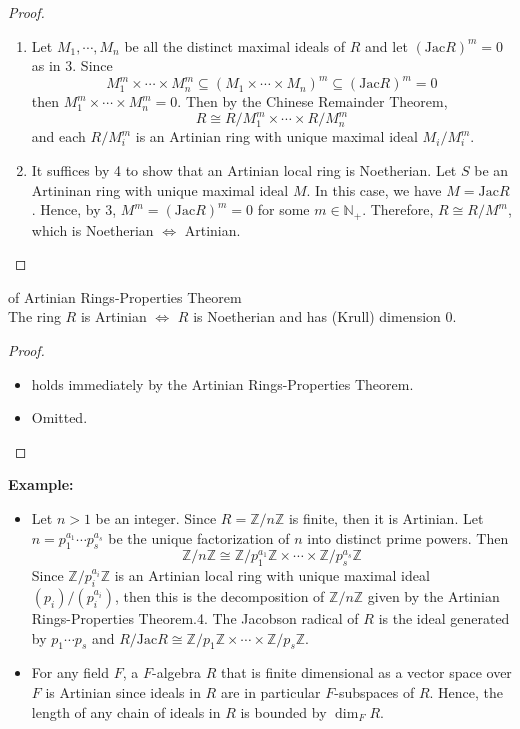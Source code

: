 \begin{proof}
\begin{enumerate}
        \item Let $M_1 ,\cdots, M_n$ be all the distinct maximal ideals of $R$ and let $(\text{Jac}R)^m =0$ as in 3. Since
        $$M_1 ^m \times \cdots \times M_n^m \subseteq (M_1 \times \cdots \times M_n)^m \subseteq (\text{Jac}R)^m =0$$
        then $M_1 ^m \times \cdots \times M_n^m=0$. Then by the Chinese Remainder Theorem,
        $$R \cong R/M_1^m \times \cdots \times R/M_n^m$$
        and each $R/M_i^m$ is an Artinian ring with unique maximal ideal $M_i/M_i^m$.

        \item It suffices by 4 to show that an Artinian local ring is Noetherian. Let $S$ be an Artininan ring with unique maximal ideal $M$. In this case, we have $M= \text{Jac}R$. Hence, by 3, $M^m =(\text{Jac}R)^m=0$ for some $m \in \mathbb{
        N
        }_+$. Therefore, $R\cong R/M^m$, which is Noetherian $\Leftrightarrow$ Artinian.
    \end{enumerate}
\end{proof}

\begin{corollary}{of Artinian Rings-Properties Theorem}\\
The ring $R$ is Artinian $\Leftrightarrow$ $R$ is Noetherian and has (Krull) dimension $0$.
\end{corollary}

\begin{proof}
    \begin{itemize}
        \item holds immediately by the Artinian Rings-Properties Theorem.
        \item Omitted.
    \end{itemize}
\end{proof}

\noindent\textbf{Example:} \begin{itemize}
    \item Let $n>1$ be an integer. Since $R= \mathbb{Z}/ n\mathbb{Z}$ is finite, then it is Artinian. Let $n =p_1^{a_1} \cdots p_s^{a_s}$ be the unique factorization of $n$ into distinct prime powers. Then 
    $$\mathbb{Z}/ n\mathbb{Z} \cong \mathbb{Z}/ p_1^{a_1} \mathbb{Z} \times \cdots\times \mathbb{Z}/ p_s ^{a_s}\mathbb{Z}$$
    Since $\mathbb{Z}/ p_i^{a_i}\mathbb{Z}$ is an Artinian local ring with unique maximal ideal $(p_i)/ (p_i^{a_i})$, then this is the decomposition of $\mathbb{Z}/ n\mathbb{Z}$ given by the Artinian Rings-Properties Theorem.4. The Jacobson radical of $R$ is the ideal generated by $p_1 \cdots p_s$ and $R/ \text{Jac}R \cong \mathbb{Z}/ p_1\mathbb{Z} \times \cdots \times \mathbb{Z}/ p_s\mathbb{Z}$.

    \item For any field $F$, a $F$-algebra $R$ that is finite dimensional as a vector space over $F$ is Artinian since ideals in $R$ are in particular $F$-subspaces of $R$. Hence, the length of any chain of ideals in $R$ is bounded by $\dim_F R$.
\end{itemize}

